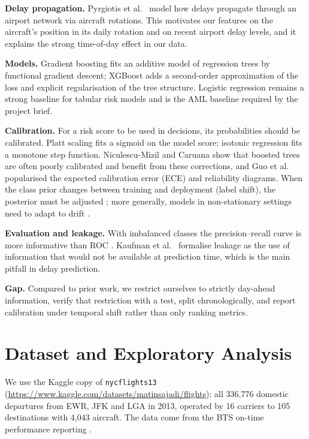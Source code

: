 \documentclass[conference]{IEEEtran}
\begin{document}
\textbf{Delay propagation.} Pyrgiotis et al.\ \cite{pyrgiotis2013} model how delays
propagate through an airport network via aircraft rotations. This motivates our
features on the aircraft's position in its daily rotation and on recent airport delay
levels, and it explains the strong time-of-day effect in our data.

\textbf{Models.} Gradient boosting \cite{friedman2001} fits an additive model of
regression trees by functional gradient descent; XGBoost \cite{chen2016xgboost}
adds a second-order approximation of the loss and explicit regularisation of the
tree structure. Logistic regression remains a strong baseline for tabular risk
models and is the AML baseline required by the project brief.

\textbf{Calibration.} For a risk score to be used in decisions, its probabilities
should be calibrated. Platt scaling \cite{platt1999} fits a sigmoid on the model score;
isotonic regression \cite{zadrozny2002} fits a monotone step function.
Niculescu-Mizil and Caruana \cite{niculescu2005} show that boosted trees are often
poorly calibrated and benefit from these corrections, and Guo et al.\
\cite{guo2017calibration} popularised the expected calibration error (ECE) and
reliability diagrams. When the class prior changes between training and deployment
(label shift), the posterior must be adjusted \cite{saerens2002,lipton2018};
more generally, models in non-stationary settings need to adapt to drift
\cite{gama2014}.

\textbf{Evaluation and leakage.} With imbalanced classes the precision--recall curve is
more informative than ROC \cite{saito2015}. Kaufman et al.\ \cite{kaufman2012leakage}
formalise leakage as the use of information that would not be available at prediction
time, which is the main pitfall in delay prediction.

\textbf{Gap.} Compared to prior work, we restrict ourselves to strictly day-ahead
information, verify that restriction with a test, split chronologically, and report
calibration under temporal shift rather than only ranking metrics.

\section{Dataset and Exploratory Analysis}
We use the Kaggle copy of \texttt{nycflights13} \cite{nycflights13}
(\url{https://www.kaggle.com/datasets/matinsajadi/flights}): all 336{,}776
domestic departures from EWR, JFK and LGA in 2013, operated by 16 carriers to 105
destinations with 4{,}043 aircraft. The data come from the BTS on-time performance
reporting \cite{bts_ontime}.
\end{document}
